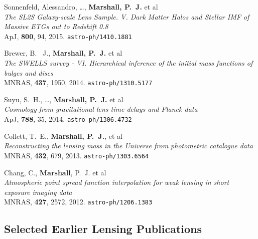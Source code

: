 \begin{revnumerate}

  \item{Sonnenfeld, Alessandro, \ldots, \textbf{Marshall, P.~J.} et al\\
  \textit{The SL2S Galaxy-scale Lens Sample. V. Dark Matter Halos and Stellar IMF of Massive ETGs out to Redshift 0.8}\\
  ApJ, \textbf{800}, 94, 2015.
  \texttt{astro-ph/1410.1881}
  }

  \item{{Brewer}, B.~ J., \textbf{Marshall, P.~J.} et al\\
  \textit{The SWELLS survey - VI. Hierarchical inference of the initial mass functions of bulges and discs}\\
  MNRAS, \textbf{437}, 1950, 2014.
  \texttt{astro-ph/1310.5177}
  }

  \item{{Suyu}, S.~H., \ldots, \textbf{{Marshall}, P.~J.} et al\\
  \textit{Cosmology from gravitational lens time delays and Planck data}\\
  ApJ, \textbf{788}, 35, 2014.
  \texttt{astro-ph/1306.4732}
  }

  \item{Collett, T.~E., \textbf{Marshall, P.~J.}, et al\\
  \textit{Reconstructing the lensing mass in the Universe from photometric catalogue data}\\
  MNRAS, \textbf{432}, 679, 2013.
  \texttt{astro-ph/1303.6564}
  }

  \item{{Chang}, C., \textbf{Marshall}, P.~J. et al\\
  \textit{Atmospheric point spread function interpolation for weak lensing in short exposure imaging data}\\
  MNRAS, \textbf{427}, 2572, 2012.
  \texttt{astro-ph/1206.1383}
  }

\end{revnumerate}



\subsection*{Selected Earlier Lensing Publications}

